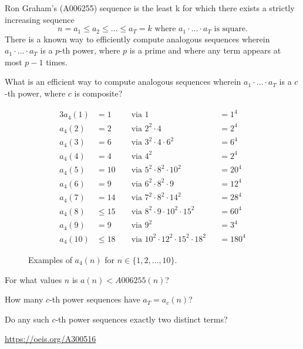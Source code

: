 \documentclass{article}
\begin{document}
  Ron Graham's (A006255) sequence is the least k for which there exists a
  strictly increasing sequence \[
    n = a_1 \leq a_2 \leq \hdots \leq a_T = k \text{ where }
    a_1 \cdot\hdots\cdot a_T \text{ is square.}
  \]
  There is a known way to efficiently compute analogous sequences wherein
  $a_1 \cdot\hdots\cdot a_T$ is a $p$-th power, where $p$ is a prime and where
  any term appears at most $p - 1$ times.
\begin{question}
  What is an efficient way to compute analogous sequences wherein
  $a_1 \cdot\hdots\cdot a_T$ is a $c$-th power, where $c$ is composite?
\end{question}
\begin{figure}[!h]
  \centering
  \begin{alignat*}{3}
  a_4(1) &= 1      &&\text{ via } 1                                     &&= 1^4\\
  a_4(2) &= 2      &&\text{ via } 2^2 \cdot 4                           &&= 2^4\\
  a_4(3) &= 6      &&\text{ via } 3^2 \cdot 4 \cdot 6^2                 &&= 6^4\\
  a_4(4) &= 4      &&\text{ via } 4^2                                   &&= 2^4\\
  a_4(5) &= 10     &&\text{ via } 5^2 \cdot 8^2 \cdot 10^2              &&= 20^4\\
  a_4(6) &= 9      &&\text{ via } 6^2 \cdot 8^2 \cdot 9                 &&= 12^4\\
  a_4(7) &= 14     &&\text{ via } 7^2 \cdot 8^2 \cdot 14^2              &&= 28^4\\
  a_4(8) &\leq 15  &&\text{ via } 8^2 \cdot 9 \cdot 10^2 \cdot 15^2     &&= 60^4\\
  a_4(9) &= 9      &&\text{ via } 9^2                                   &&= 3^4\\
  a_4(10) &\leq 18 &&\text{ via } 10^2 \cdot 12^2 \cdot 15^2 \cdot 18^2 &&= 180^4
  \end{alignat*}
  \caption{
    Examples of $a_4(n)$ for $n \in \{1, 2,\hdots,10\}$.
  }
\end{figure}

\begin{related}
  \item For what values $n$ is $a(n) < A006255(n)$?
  \item How many $c$-th power sequences have $a_T = a_c(n)$?
  \item Do any such $c$-th power sequences exactly two distinct terms?
\end{related}

\begin{references}
  \item \url{https://oeis.org/A300516}
\end{references}
\end{document}
